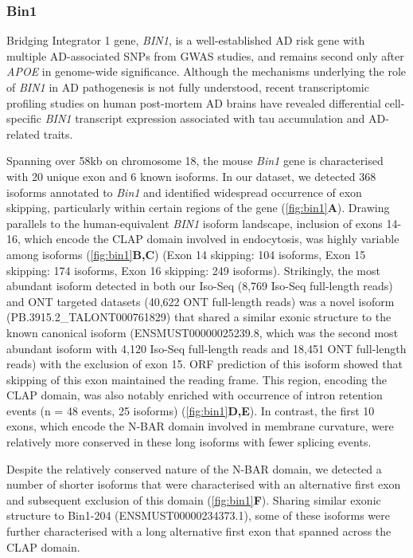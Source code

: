 \newpage
\subsubsection{Bin1}
\label{ch5: bin1_annotation}
Bridging Integrator 1 gene, \textit{BIN1}, is a well-established AD risk gene with multiple AD-associated SNPs from GWAS studies, and remains second only after \textit{APOE} in genome-wide significance\cite{Kunkle2019}. Although the mechanisms underlying the role of \textit{BIN1} in AD pathogenesis is not fully understood, recent transcriptomic profiling studies on human post-mortem AD brains have revealed differential cell-specific \textit{BIN1} transcript expression associated with tau accumulation and AD-related traits\cite{Taga2020}. 

Spanning over 58kb on chromosome 18, the mouse \textit{Bin1} gene is characterised with 20 unique exon and 6 known isoforms. In our dataset, we detected 368 isoforms annotated to \textit{Bin1} and identified widespread occurrence of exon skipping, particularly within certain regions of the gene (\cref{fig:bin1}\textbf{A}). Drawing parallels to the human-equivalent \textit{BIN1} isoform landscape\cite{Taga2020}, inclusion of exons 14-16, which encode the CLAP domain involved in endocytosis, was highly variable among isoforms (\cref{fig:bin1}\textbf{B,C}) (Exon 14 skipping: 104 isoforms, Exon 15 skipping: 174 isoforms, Exon 16 skipping: 249 isoforms). Strikingly, the most abundant isoform detected in both our Iso-Seq (8,769 Iso-Seq full-length reads) and ONT targeted datasets (40,622 ONT full-length reads) was a novel isoform (PB.3915.2\_TALONT000761829) that shared a similar exonic structure to the known canonical isoform (ENSMUST00000025239.8, which was the second most abundant isoform with 4,120 Iso-Seq full-length reads and 18,451 ONT full-length reads) with the exclusion of exon 15. ORF prediction of this isoform showed that skipping of this exon maintained the reading frame. This region, encoding the CLAP domain, was also notably enriched with occurrence of intron retention events (n = 48 events, 25 isoforms) (\cref{fig:bin1}\textbf{D,E}). In contrast, the first 10 exons, which encode the N-BAR domain involved in membrane curvature, were relatively more conserved in these long isoforms with fewer splicing events. 

Despite the relatively conserved nature of the N-BAR domain, we detected a number of shorter isoforms that were characterised with an alternative first exon and subsequent exclusion of this domain (\cref{fig:bin1}\textbf{F}). Sharing similar exonic structure to Bin1-204 (ENSMUST00000234373.1), some of these isoforms were further characterised with a long alternative first exon that spanned across the CLAP domain. 

